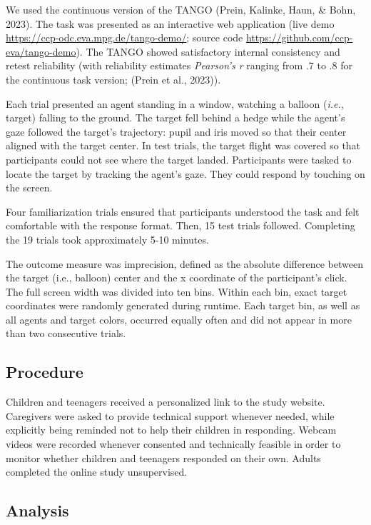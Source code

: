\documentclass[
  man,mask,floatsintext]{apa6}
\begin{document}
We used the continuous version of the TANGO (Prein, Kalinke, Haun, \& Bohn, 2023). The task was presented as an interactive web application (live demo \href{https://ccp-odc.eva.mpg.de/tango-demo/.}{https://ccp-odc.eva.mpg.de/tango-demo/}; source code \url{https://github.com/ccp-eva/tango-demo}). The TANGO showed satisfactory internal consistency and retest reliability (with reliability estimates \emph{Pearson's r} ranging from .7 to .8 for the continuous task version; (Prein et al., 2023)).

Each trial presented an agent standing in a window, watching a balloon (\emph{i.e.}, target) falling to the ground. The target fell behind a hedge while the agent's gaze followed the target's trajectory: pupil and iris moved so that their center aligned with the target center. In test trials, the target flight was covered so that participants could not see where the target landed. Participants were tasked to locate the target by tracking the agent's gaze. They could respond by touching on the screen.

Four familiarization trials ensured that participants understood the task and felt comfortable with the response format. Then, 15 test trials followed. Completing the 19 trials took approximately 5-10 minutes.

The outcome measure was imprecision, defined as the absolute difference between the target (i.e., balloon) center and the x coordinate of the participant's click. The full screen width was divided into ten bins. Within each bin, exact target coordinates were randomly generated during runtime. Each target bin, as well as all agents and target colors, occurred equally often and did not appear in more than two consecutive trials.

\hypertarget{procedure}{%
\subsection{Procedure}\label{procedure}}

Children and teenagers received a personalized link to the study website. Caregivers were asked to provide technical support whenever needed, while explicitly being reminded not to help their children in responding. Webcam videos were recorded whenever consented and technically feasible in order to monitor whether children and teenagers responded on their own. Adults completed the online study unsupervised.

\hypertarget{analysis}{%
\subsection{Analysis}\label{analysis}}
\end{document}
